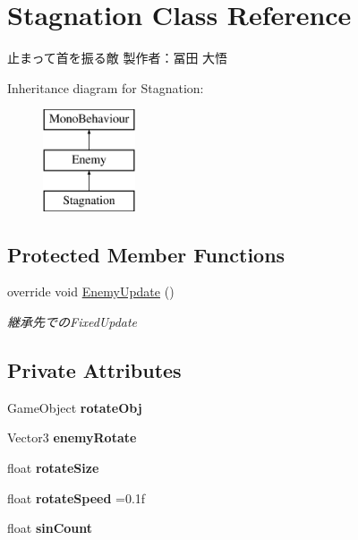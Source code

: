 \hypertarget{class_stagnation}{}\section{Stagnation Class Reference}
\label{class_stagnation}


止まって首を振る敵 製作者：冨田 大悟  


Inheritance diagram for Stagnation\+:\begin{figure}[H]
\begin{center}
\leavevmode
\includegraphics[height=3.000000cm]{class_stagnation}
\end{center}
\end{figure}
\subsection*{Protected Member Functions}
\begin{DoxyCompactItemize}
\item 
override void \hyperlink{class_stagnation_ae0fe7818f0319e53bf2f25d8659af12f}{Enemy\+Update} ()
\begin{DoxyCompactList}\small\item\em 継承先での\+Fixed\+Update \end{DoxyCompactList}\end{DoxyCompactItemize}
\subsection*{Private Attributes}
\begin{DoxyCompactItemize}
\item 
\mbox{\label{class_stagnation_ac36ef57f6d89bf2f362a013120f871f2}} 
Game\+Object {\bfseries rotate\+Obj}
\item 
\mbox{\label{class_stagnation_a1d0ee829b3d56d5499e160b8de980f60}} 
Vector3 {\bfseries enemy\+Rotate}
\item 
\mbox{\label{class_stagnation_aad824be7f644f42793c4728af0e52f14}} 
float {\bfseries rotate\+Size}
\item 
\mbox{\label{class_stagnation_a2640296850f4520719af5953d77cb213}} 
float {\bfseries rotate\+Speed} =0.\+1f
\item 
\mbox{\label{class_stagnation_ac3b17e313a693cec48097e393f2c919c}} 
float {\bfseries sin\+Count}
\end{DoxyCompactItemize}
